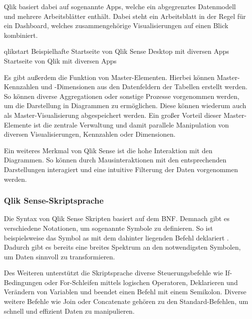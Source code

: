 Qlik basiert dabei auf sogenannte \glqq Apps\grqq{}, welche ein abgegrenztes Datenmodell und mehrere Arbeitsblätter enthält.
Dabei steht ein Arbeitsblatt in der Regel für ein \gls{Dashboard}, welches zusammengehörige Visualisierungen auf einen Blick kombiniert.

\bildbreit
{qlikstart}
{Beispielhafte Startseite von Qlik Sense Desktop mit diversen Apps}
{Startseite von Qlik mit diversen Apps}

Es gibt außerdem die Funktion von Master-Elementen.
Hierbei können Master-Kennzahlen und -Dimensionen aus den Datenfeldern der Tabellen erstellt werden. 
So können diverse Aggregationen oder sonstige Prozesse vorgenommen werden, um die Darstellung in Diagrammen zu ermöglichen.
Diese können wiederum auch als Master-Visualisierung abgespeichert werden.
Ein großer Vorteil dieser Master-Elemente ist die zentrale Verwaltung und damit parallele Manipulation von diversen Visualisierungen, Kennzahlen oder Dimensionen.

Ein weiteres Merkmal von Qlik Sense ist die hohe Interaktion mit den Diagrammen.
So können durch Mausinteraktionen mit den entsprechenden Darstellungen interagiert und eine intuitive Filterung der Daten vorgenommen werden.

\subsubsection{Qlik Sense-Skriptsprache}
Die Syntax von Qlik Sense Skripten basiert auf dem \gls{BNF}. 
Demnach gibt es verschiedene Notationen, um sogenannte \glqq Symbole\grqq{} zu definieren.
So ist beispielsweise das Symbol \glqq as\grqq{} mit dem dahinter liegenden Befehl  deklariert \cite{QlikTech.Februar2019}.
Dadurch gibt es bereits eine breites Spektrum an den notwendigsten Symbolen, um Daten sinnvoll zu transformieren.

Des Weiteren unterstützt die Skriptsprache diverse Steuerungsbefehle wie If-Bedingungen oder For-Schleifen mittels logischen Operatoren, Deklarieren und Verändern von Variablen und beendet einen Befehl mit einem Semikolon.
Diverse weitere Befehle wie \glqq Join\grqq{} oder \glqq Concatenate\grqq{} gehören zu den Standard-Befehlen, um schnell und effizient Daten zu manipulieren.

